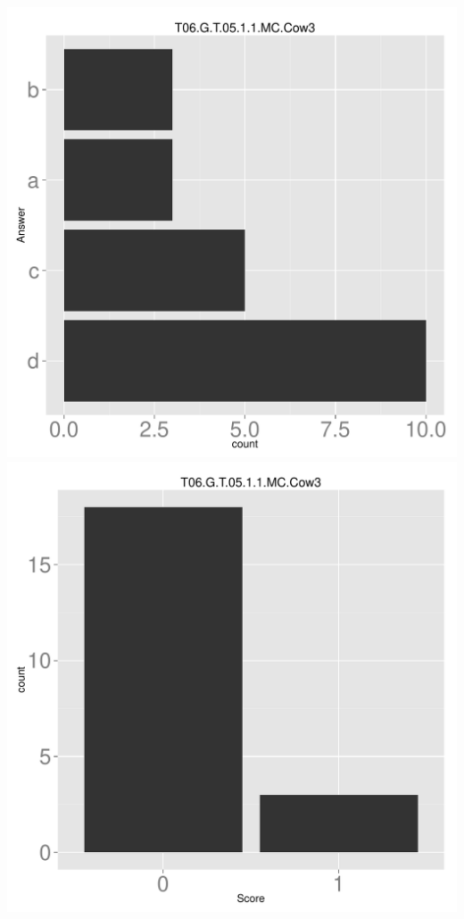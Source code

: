 \documentclass[12pt,nohyper]{tufte-handout}\usepackage[]{graphicx}\usepackage[]{color}
\begin{document}
\begin{center} \includegraphics[width=.45\linewidth]{Topic06_84_answer} \includegraphics[width=.45\linewidth]{Topic06_84_score} \end{center} 
\end{document}
